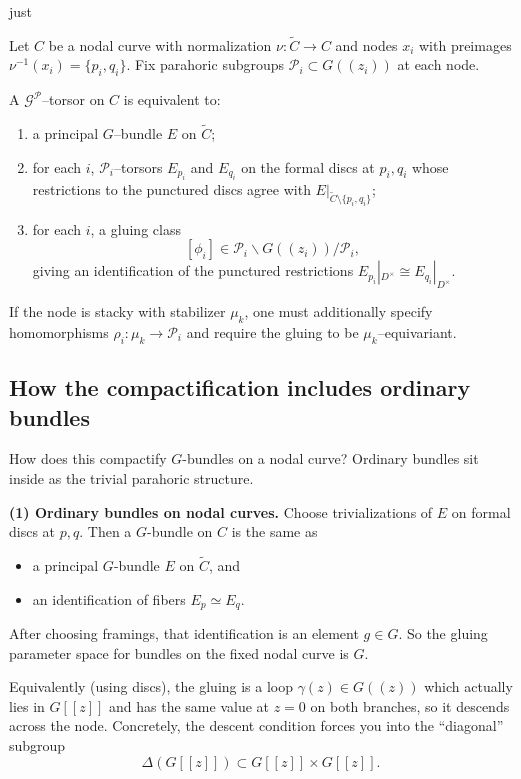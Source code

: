 just \documentclass[12pt]{article}
\begin{document}
\begin{proposition}
Let $C$ be a nodal curve with normalization
$\nu:\widetilde C\to C$ and nodes $x_i$ with preimages
$\nu^{-1}(x_i)=\{p_i,q_i\}$.
Fix parahoric subgroups
$\mathcal P_i\subset G((z_i))$ at each node.

A $\mathcal G^{\mathcal P}$--torsor on $C$ is equivalent to:

\begin{enumerate}
\item a principal $G$--bundle $E$ on $\widetilde C$;

\item for each $i$, $\mathcal P_i$--torsors
$E_{p_i}$ and $E_{q_i}$ on the formal discs at $p_i,q_i$
whose restrictions to the punctured discs agree with
$E|_{\widetilde C\setminus\{p_i,q_i\}}$;

\item for each $i$, a gluing class
\[
[\phi_i]\in
\mathcal P_i \backslash G((z_i)) / \mathcal P_i ,
\]
giving an identification of the punctured restrictions
$E_{p_i}|_{D^\times}\cong E_{q_i}|_{D^\times}$.
\end{enumerate}

If the node is stacky with stabilizer $\mu_k$,
one must additionally specify homomorphisms
$\rho_i:\mu_k\to \mathcal P_i$
and require the gluing to be $\mu_k$--equivariant.
\end{proposition}
\subsection*{How the compactification includes ordinary bundles}

How does this compactify $G$-bundles on a nodal curve? Ordinary bundles sit inside as the trivial parahoric structure.

\medskip
\noindent\textbf{(1) Ordinary bundles on nodal curves.}
Choose trivializations of $E$ on formal discs at $p,q$. Then a $G$-bundle on $C$ is the same as
\begin{itemize}
\item a principal $G$-bundle $E$ on $\widetilde C$, and
\item an identification of fibers $E_p\simeq E_q$.
\end{itemize}
After choosing framings, that identification is an element $g\in G$.
So the gluing parameter space for bundles on the fixed nodal curve is $G$.

Equivalently (using discs), the gluing is a loop $\gamma(z)\in G((z))$ which actually lies in $G[[z]]$ and has the same value at $z=0$ on both branches, so it descends across the node. Concretely, the descent condition forces you into the ``diagonal'' subgroup
\[
\Delta(G[[z]])\subset G[[z]]\times G[[z]].
\]
\end{document}
